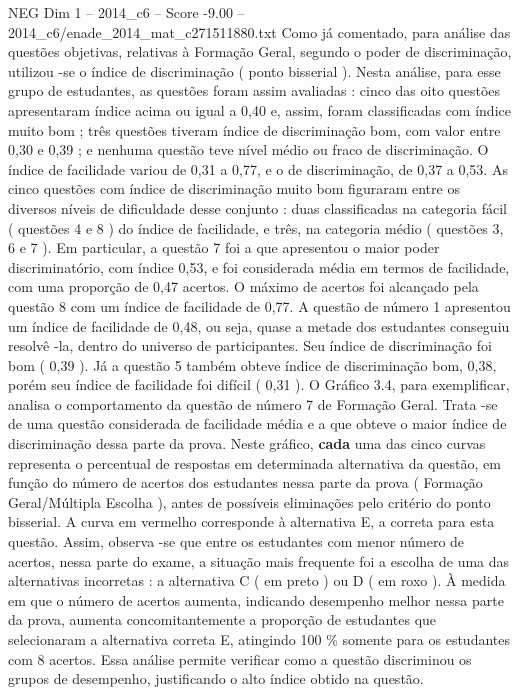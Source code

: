 \begin{textsample}{NEG Dim 1 – 2014\_c6 – Score -9.00 – 2014\_c6/enade\_2014\_mat\_c271511880.txt}
Como já comentado, para análise das questões objetivas, relativas à Formação Geral, segundo o poder de discriminação, utilizou -se o índice de discriminação ( ponto bisserial ).
Nesta análise, para esse grupo de estudantes, as questões foram assim avaliadas : cinco das oito questões apresentaram índice acima ou igual a 0,40 e, assim, foram classificadas com índice muito bom ; três questões tiveram índice de discriminação bom, com valor entre 0,30 e 0,39 ; e nenhuma questão teve nível médio ou fraco de discriminação.
O índice de facilidade variou de 0,31 a 0,77, e o de discriminação, de 0,37 a 0,53.
As cinco questões com índice de discriminação muito bom figuraram entre os diversos níveis de dificuldade desse conjunto : duas classificadas na categoria fácil ( questões 4 e 8 ) do índice de facilidade, e três, na categoria médio ( questões 3, 6 e 7 ).
Em particular, a questão 7 foi a que apresentou o maior poder discriminatório, com índice 0,53, e foi considerada média em termos de facilidade, com uma proporção de 0,47 acertos.
O máximo de acertos foi alcançado pela questão 8 com um índice de facilidade de 0,77.
A questão de número 1 apresentou um índice de facilidade de 0,48, ou seja, quase a metade dos estudantes conseguiu resolvê -la, dentro do universo de participantes.
Seu índice de discriminação foi bom ( 0,39 ).
Já a questão 5 também obteve índice de discriminação bom, 0,38, porém seu índice de facilidade foi difícil ( 0,31 ).
O Gráfico 3.4, para exemplificar, analisa o comportamento da questão de número 7 de Formação Geral.
Trata -se de uma questão considerada de facilidade média e a que obteve o maior índice de discriminação dessa parte da prova.
Neste gráfico, \textbf{cada} uma das cinco curvas representa o percentual de respostas em determinada alternativa da questão, em função do número de acertos dos estudantes nessa parte da prova ( Formação Geral/Múltipla Escolha ), antes de possíveis eliminações pelo critério do ponto bisserial.
A curva em vermelho corresponde à alternativa E, a correta para esta questão.
Assim, observa -se que entre os estudantes com menor número de acertos, nessa parte do exame, a situação mais frequente foi a escolha de uma das alternativas incorretas : a alternativa C ( em preto ) ou D ( em roxo ).
À medida em que o número de acertos aumenta, indicando desempenho melhor nessa parte da prova, aumenta concomitantemente a proporção de estudantes que selecionaram a alternativa correta E, atingindo 100 \% somente para os estudantes com 8 acertos.
Essa análise permite verificar como a questão discriminou os grupos de desempenho, justificando o alto índice obtido na questão.

\end{textsample}
